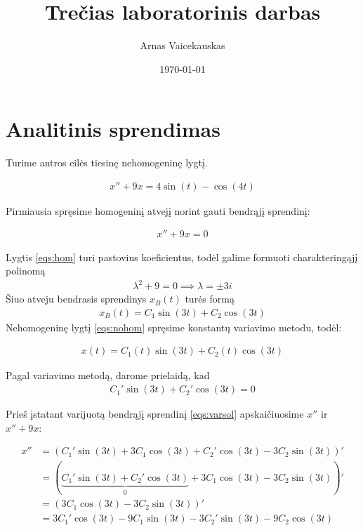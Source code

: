 \documentclass[11pt]{article}
\title{ Trečias laboratorinis darbas}
\author{ Arnas Vaicekauskas }
\date{\today}
\begin{document}
\maketitle

\section{Analitinis sprendimas}

Turime antros eilės tiesinę nehomogeninę lygtį.

\begin{align}
x''+9x=4\sin(t)-\cos(4t) \label{eqs:nohom}
\end{align}

Pirmiausia spręsime homogeninį atvejį norint gauti bendrąjį sprendinį:

\begin{align}
    x''+9x=0 \label{eqs:hom}
\end{align}

Lygtis \eqref{eqs:hom} turi pastovius koeficientus, 
todėl galime formuoti charakteringąjį polinomą
\begin{align*}
    \lambda^2+9=0\implies\lambda=\pm3i
\end{align*}
Šiuo atveju bendrasis sprendinys $x_B(t)$ turės formą 
\begin{align}
x_B(t)=C_1\sin(3t)+C_2\cos(3t)
\end{align}
Nehomogeninę lygtį \eqref{eqs:nohom} spręsime
konstantų variavimo metodu, todėl:

\begin{align}
x(t)=C_1(t)\sin(3t)+C_2(t)\cos(3t) \label{eqs:varsol}
\end{align}

Pagal variavimo metodą, darome prielaidą, kad 
\begin{align}
C_1'\sin(3t)+C_2'\cos(3t)=0  \label{eqs:assumtion}
\end{align}

Prieš įstatant varijuotą bendrąjį sprendinį \eqref{eqs:varsol} apskaičiuosime $x''$ ir \\ $x''+9x$: 

\begin{align*}
x''&=(C_1'\sin(3t)+3C_1\cos(3t)+C_2'\cos(3t)-3C_2\sin(3t))'\\
&=(\underbrace{C_1'\sin(3t)+C_2'\cos(3t)}_0+3C_1\cos(3t)-3C_2\sin(3t))'\\
&=(3C_1\cos(3t)-3C_2\sin(3t))'\\
&=3C_1'\cos(3t)-9C_1\sin(3t)-3C_2'\sin(3t)-9C_2\cos(3t)
\end{align*}
\end{document}
